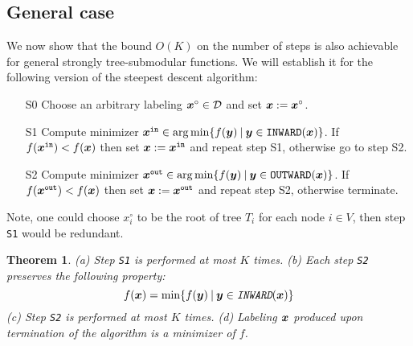 \documentclass[11pt,onecolumn]{article}
\newtheorem{theorem}{Theorem}
\def\D{{\cal D}}
\def\INWARD{\texttt{INWARD}}
\def\OUTWARD{\texttt{OUTWARD}}
\newcommand{\bx}{\mbox{\boldmath $x$}}
\newcommand{\by}{\mbox{\boldmath $y$}}
\begin{document}
\subsection{General case}
We now show that the bound $O(K)$ on the number of steps 
is also achievable for general strongly tree-submodular functions. 
We will establish it for the following version of the steepest descent algorithm:
\begin{itemize}
\item[S0] Choose an arbitrary labeling $\bx^\circ\in \D$ and set $\bx:=\bx^\circ$.
\item[S1] Compute minimizer $\bx^{\tt in}\in\arg\min \{ f(\by) \:|\: \by\in\INWARD(\bx) \}$. If $f(\bx^{\tt in})<f(\bx)$
then set $\bx:=\bx^{\tt in}$ and repeat step S1, otherwise go to step S2.
\item[S2] Compute minimizer $\bx^{\tt out}\in\arg\min \{ f(\by) \:|\: \by\in\OUTWARD(\bx) \}$. If $f(\bx^{\tt out})<f(\bx)$ then set $\bx:=\bx^{\tt out}$ and repeat step S2, otherwise terminate.
\end{itemize}
Note, one could choose $x^\circ_i$ to be the root of tree $T_i$ for each node $i\in V$, then step {\tt S1} would be redundant. 

\begin{theorem}
(a) Step {\tt S1} is performed at most $K$ times. (b) Each step {\tt S2} preserves the following
property:
\begin{equation}
\mbox{\em $f(\bx)=\min \{f(\by)\:|\:\by\in\INWARD(\bx)\}$}
\label{eq:complexity:b}
\end{equation}
(c) Step {\tt S2} is performed at most $K$ times.
(d) Labeling $\bx$ produced upon termination of the algorithm is a minimizer of $f$.
\label{th:complexity}
\end{theorem}
\end{document}
